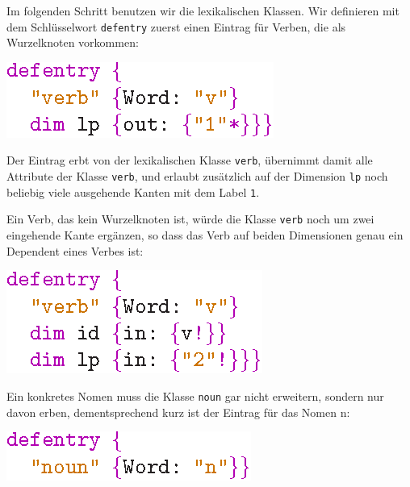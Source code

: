 Im folgenden Schritt benutzen wir die lexikalischen Klassen. Wir
definieren mit dem Schl\"usselwort {\tt defentry} zuerst einen Eintrag
f\"ur Verben, die als Wurzelknoten vorkommen:
\begin{center}
\includegraphics[scale=1.0]{eps/verbroot}
\end{center}
Der Eintrag erbt von der lexikalischen Klasse {\tt verb}, \"ubernimmt
damit alle Attribute der Klasse {\tt verb}, und erlaubt zus\"atzlich
auf der Dimension {\tt lp} noch beliebig viele ausgehende Kanten mit
dem Label {\tt 1}.

Ein Verb, das kein Wurzelknoten ist, w\"urde die Klasse {\tt verb}
noch um zwei eingehende Kante erg\"anzen, so dass das Verb auf beiden
Dimensionen genau ein Dependent eines Verbes ist:
\begin{center}
\includegraphics[scale=1.0]{eps/verbdependent}
\end{center}

Ein konkretes Nomen muss die Klasse {\tt noun} gar nicht erweitern,
sondern nur davon erben, dementsprechend kurz ist der Eintrag f\"ur
das Nomen n:
\begin{center}
\includegraphics[scale=1.0]{eps/nounentry}
\end{center}

